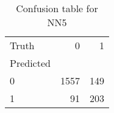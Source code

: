 \begin{table}[h!]
\caption{Confusion table for NN5}
\label{tab:NN5}
\begin{tabular}{lrr}
\toprule
Truth & 0 & 1 \\
Predicted &  &  \\
\midrule
0 & 1557 & 149 \\
1 & 91 & 203 \\
\bottomrule
\end{tabular}
\end{table}
